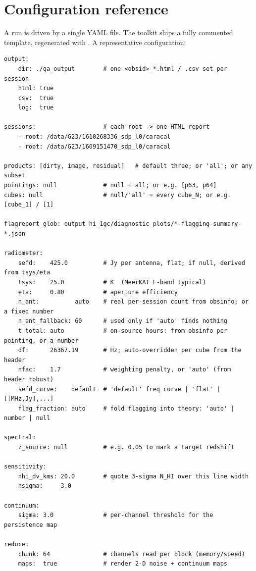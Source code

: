 \documentclass[11pt,a4paper]{article}
\begin{document}
\section{Configuration reference}\label{sec:config}
A run is driven by a single YAML file. The toolkit ships a fully commented
template, regenerated with . A
representative configuration:

\begin{lstlisting}
output:
    dir: ./qa_output        # one <obsid>_*.html / .csv set per session
    html: true
    csv:  true
    log:  true

sessions:                   # each root -> one HTML report
    - root: /data/G23/1610268336_sdp_l0/caracal
    - root: /data/G23/1609151470_sdp_l0/caracal

products: [dirty, image, residual]   # default three; or 'all'; or any subset
pointings: null             # null = all; or e.g. [p63, p64]
cubes: null                 # null/'all' = every cube_N; or e.g. [cube_1] / [1]

flagreport_glob: output_hi_1gc/diagnostic_plots/*-flagging-summary-*.json

radiometer:
    sefd:    425.0          # Jy per antenna, flat; if null, derived from tsys/eta
    tsys:    25.0           # K  (MeerKAT L-band typical)
    eta:     0.80           # aperture efficiency
    n_ant:          auto    # real per-session count from obsinfo; or a fixed number
    n_ant_fallback: 60      # used only if 'auto' finds nothing
    t_total: auto           # on-source hours: from obsinfo per pointing, or a number
    df:      26367.19       # Hz; auto-overridden per cube from the header
    nfac:    1.7            # weighting penalty, or 'auto' (from header robust)
    sefd_curve:    default  # 'default' freq curve | 'flat' | [[MHz,Jy],...]
    flag_fraction: auto     # fold flagging into theory: 'auto' | number | null

spectral:
    z_source: null          # e.g. 0.05 to mark a target redshift

sensitivity:
    nhi_dv_kms: 20.0        # quote 3-sigma N_HI over this line width
    nsigma:     3.0

continuum:
    sigma: 3.0              # per-channel threshold for the persistence map

reduce:
    chunk: 64               # channels read per block (memory/speed)
    maps:  true             # render 2-D noise + continuum maps


\end{lstlisting}
\end{document}
